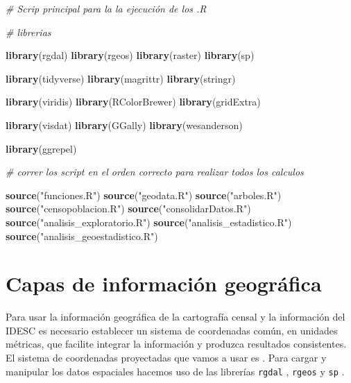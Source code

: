\documentclass[12pt,]{book}
\newenvironment{Shaded}{\begin{snugshade}}{\end{snugshade}}
\newcommand{\KeywordTok}[1]{\textcolor[rgb]{0.13,0.29,0.53}{\textbf{#1}}}
\newcommand{\StringTok}[1]{\textcolor[rgb]{0.31,0.60,0.02}{#1}}
\newcommand{\CommentTok}[1]{\textcolor[rgb]{0.56,0.35,0.01}{\textit{#1}}}
\newcommand{\NormalTok}[1]{#1}
\begin{document}
\begin{Shaded}
\begin{Highlighting}[]
\CommentTok{# Scrip principal para la la ejecución de los .R}

\CommentTok{# librerias}

\KeywordTok{library}\NormalTok{(rgdal)}
\KeywordTok{library}\NormalTok{(rgeos)}
\KeywordTok{library}\NormalTok{(raster)}
\KeywordTok{library}\NormalTok{(sp)}

\KeywordTok{library}\NormalTok{(tidyverse)}
\KeywordTok{library}\NormalTok{(magrittr)}
\KeywordTok{library}\NormalTok{(stringr)}

\KeywordTok{library}\NormalTok{(viridis)}
\KeywordTok{library}\NormalTok{(RColorBrewer)}
\KeywordTok{library}\NormalTok{(gridExtra)}

\KeywordTok{library}\NormalTok{(visdat)}
\KeywordTok{library}\NormalTok{(GGally)}
\KeywordTok{library}\NormalTok{(wesanderson)}

\KeywordTok{library}\NormalTok{(ggrepel)}


\CommentTok{# correr los script en el orden correcto para realizar todos los calculos}

\KeywordTok{source}\NormalTok{(}\StringTok{"funciones.R"}\NormalTok{)}
\KeywordTok{source}\NormalTok{(}\StringTok{"geodata.R"}\NormalTok{)}
\KeywordTok{source}\NormalTok{(}\StringTok{"arboles.R"}\NormalTok{)}
\KeywordTok{source}\NormalTok{(}\StringTok{"censopoblacion.R"}\NormalTok{)}
\KeywordTok{source}\NormalTok{(}\StringTok{"consolidarDatos.R"}\NormalTok{)}
\KeywordTok{source}\NormalTok{(}\StringTok{"analisis_exploratorio.R"}\NormalTok{)}
\KeywordTok{source}\NormalTok{(}\StringTok{"analisis_estadistico.R"}\NormalTok{)}
\KeywordTok{source}\NormalTok{(}\StringTok{"analisis_geoestadistico.R"}\NormalTok{)}
\end{Highlighting}
\end{Shaded}

\section{Capas de información
geográfica}\label{capas-de-informacion-geografica}

Para usar la información geográfica de la cartografía censal y la
información del IDESC es necesario establecer un sistema de coordenadas
común, en unidades métricas, que facilite integrar la información y
produzca resultados consistentes. El sistema de coordenadas proyectadas
que vamos a usar es \citet{noauthor_magna-sirgas-cali_nodate}. Para
cargar y manipular los datos espaciales hacemos uso de las librerías
\texttt{rgdal} \citep{R-rgdal}, \texttt{rgeos} \citep{R-rgeos} y
\texttt{sp} \citep{R-sp}.
\end{document}
